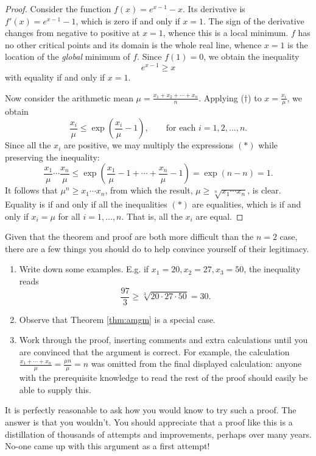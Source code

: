 \begin{proof}
Consider the function $f(x)=e^{x-1}-x$. Its derivative is $f'(x)=e^{x-1}-1$, which is zero if and only if $x=1$. The sign of the derivative changes from negative to positive at $x=1$, whence this is a local minimum. $f$ has no other critical points and its domain is the whole real line, whence $x=1$ is the location of the \emph{global} minimum of $f$. Since $f(1)=0$, we obtain the inequality
\[e^{x-1}\ge x\tag*{($\dag$)}\]
with equality if and only if $x=1$.

\noindent Now consider the arithmetic mean $\mu=\frac{x_1+x_2+\cdots +x_n}{n}$. Applying ($\dag$) to $x=\frac{x_i}\mu$, we obtain
\[\frac{x_i}\mu\le\exp\left(\frac{x_i}\mu-1\right),\qquad\text{for each $i=1,2,\ldots,n$.}\tag*{($\ast$)}\]
Since all the $x_i$ are positive, we may multiply the expressions $(\ast)$ while preserving the inequality:
\[\frac{x_1}\mu\cdots\frac{x_n}\mu\le\exp\left(\frac{x_1}{\mu}-1+\cdots+\frac{x_n}{\mu}-1\right)=\exp(n-n)=1.\]
It follows that $\mu^n\ge x_1\cdots x_n$, from which the result, $\mu\ge\sqrt[n]{x_1\cdots x_n}$, is clear.\\
Equality is if and only if all the inequalities $(\ast)$ are equalities, which is if and only if $x_i=\mu$ for all $i=1,\ldots,n$. That is, all the $x_i$ are equal.
\end{proof}

\noindent Given that the theorem and proof are both more difficult than the $n=2$ case, there are a few things you should do to help convince yourself of their legitimacy.
\begin{enumerate}\setlength{\itemsep}{0pt}
  \item Write down some examples. E.g. if $x_1=20,x_2=27,x_3=50$, the inequality reads
  \[\frac{97}3\ge\sqrt[3]{20\cdot 27\cdot 50}=30.\]
  \item Observe that Theorem \ref{thm:amgm} is a special case.
  \item Work through the proof, inserting comments and extra calculations until you are convinced that the argument is correct. For example, the calculation $\frac{x_1+\cdots+x_n}{\mu}=\frac{\mu n}\mu=n$ was omitted from the final displayed calculation: anyone with the prerequisite knowledge to read the rest of the proof should easily be able to supply this.
\end{enumerate}

\noindent It is perfectly reasonable to ask how you would know to try such a proof. The answer is that you wouldn't. You should appreciate that a proof like this is a distillation of thousands of attempts and improvements, perhaps over many years. No-one came up with this argument as a first attempt!


